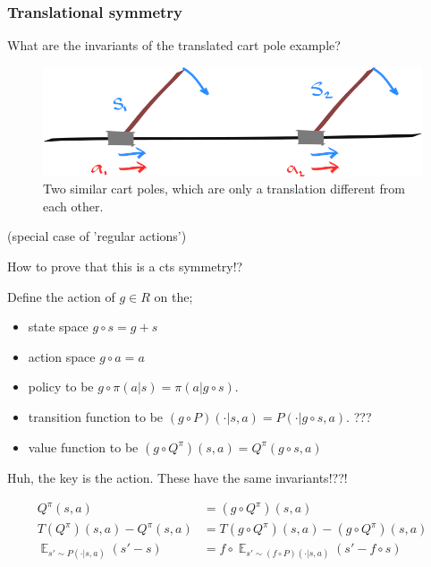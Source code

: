 \subsubsection{Translational symmetry}

What are the invariants of the translated cart pole example?

\begin{figure}[h!]
\centering
\includegraphics[width=1\textwidth,height=0.25\textheight]{../../pictures/drawings/cart-pole-translation.png}
\caption{Two similar cart poles, which are only a translation different from each other.}
\end{figure}

(special case of 'regular actions')

How to prove that this is a cts symmetry!?

Define the action of $g \in R$ on the;

\begin{itemize}
	\tightlist
	\item state space $g \circ s = g+s$
	\item action space $g \circ a = a$
 	\item policy to be $g \circ \pi(a | s) = \pi(a | g \circ s)$.
	\item transition function to be $(g \circ P)(\cdot | s, a) = P(\cdot| g \circ  s,  a)$. ???
	\item value function to be $(g \circ  Q^{\pi})(s, a) = Q^\pi(g \circ  s,  a)$
\end{itemize}

{\color{red}Huh, the key is the action. These have the same invariants!??!}

\begin{align}
Q^\pi(s, a) &= (g \circ Q^{\pi})(s, a) \tag{expected return}\\
T(Q^\pi)(s,a) - Q^\pi(s,a) &=T(g \circ Q^\pi)(s, a) - (g \circ Q^\pi)(s,a) \tag{Bellman residual}\\
\mathop{\mathbb E}_{s' \sim P(\cdot| s, a)} (s' - s) &= f \circ \mathop{\mathbb E}_{s' \sim (f \circ P)(\cdot| s, a)} (s' - f \circ s) \tag{change in state}\\
\end{align}


